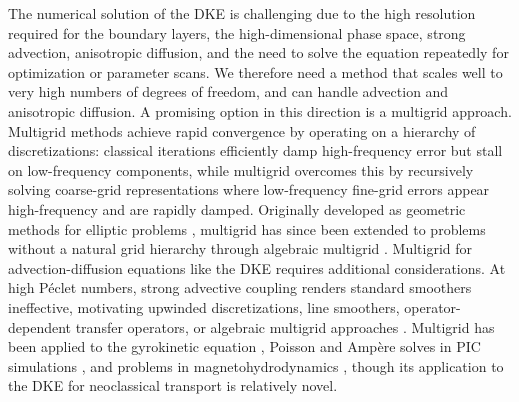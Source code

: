 \documentclass[11pt]{article}
\begin{document}
The numerical solution of the DKE is challenging due to the high resolution
required for the boundary layers, the high-dimensional phase space, strong
advection, anisotropic diffusion, and the need to solve the equation
repeatedly for optimization or parameter scans. We therefore need a method that
scales well to very high numbers of degrees of freedom, and can handle advection
and anisotropic diffusion. A promising option in this direction is a multigrid
approach. Multigrid methods
achieve rapid convergence by operating on a hierarchy of discretizations: classical
iterations efficiently damp high-frequency error but stall on low-frequency
components, while multigrid overcomes this by recursively solving coarse-grid
representations where low-frequency fine-grid errors appear high-frequency and
are rapidly damped. Originally developed as geometric methods for elliptic problems
\cite{trottenberg_multigrid_2007, bramble_multigrid_1993,
wesseling_introduction_1995},
multigrid has since been extended to problems without a natural grid hierarchy
through algebraic multigrid
\cite{mccormick_algebraic_1987, stuben_review_2001}. Multigrid for advection-diffusion
equations like the DKE requires additional considerations. At
high P\'eclet numbers, strong advective coupling renders standard smoothers
ineffective, motivating upwinded discretizations, line smoothers,
operator-dependent transfer operators, or algebraic multigrid approaches
\cite{de_zeeuw_matrix-dependent_1990, oosterlee_multigrid_1998,
wu_analysis_2006, notay_aggregation-based_2012}. Multigrid has been applied to
the gyrokinetic equation \cite{adams_parallel_2007,
stegmeir_high-performance_2026}, Poisson and Amp\`ere solves in PIC
simulations \cite{chen_multi-dimensional_2015}, and problems in
magnetohydrodynamics \cite{hackbusch_magnetohydrodynamic_1986,
adams_toward_2010}, though its
application to the DKE for neoclassical transport is relatively novel.
\end{document}
